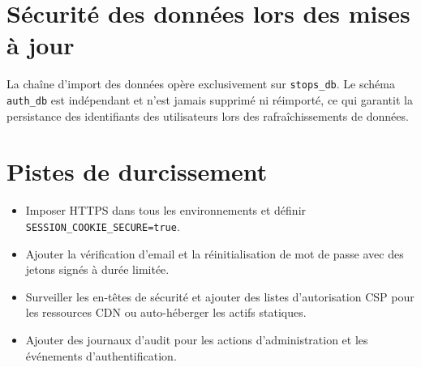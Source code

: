 \section{Sécurité des données lors des mises à jour}
La chaîne d'import des données opère exclusivement sur \texttt{stops\_db}. Le schéma \texttt{auth\_db} est indépendant et n'est jamais supprimé ni réimporté, ce qui garantit la persistance des identifiants des utilisateurs lors des rafraîchissements de données.

\section{Pistes de durcissement}
\begin{itemize}
  \item Imposer HTTPS dans tous les environnements et définir \texttt{SESSION\_COOKIE\_SECURE=true}.
  \item Ajouter la vérification d'email et la réinitialisation de mot de passe avec des jetons signés à durée limitée.
  \item Surveiller les en-têtes de sécurité et ajouter des listes d'autorisation CSP pour les ressources CDN ou auto-héberger les actifs statiques.
  \item Ajouter des journaux d'audit pour les actions d'administration et les événements d'authentification.
\end{itemize}


